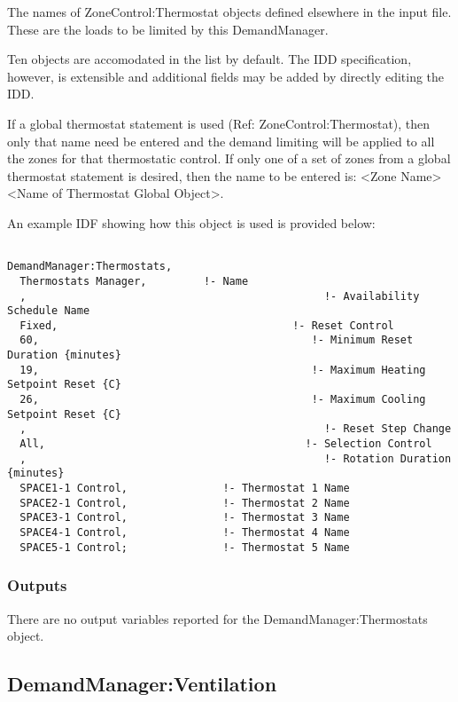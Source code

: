 The names of ZoneControl:Thermostat objects defined elsewhere in the input file. These are the loads to be limited by this DemandManager.

Ten objects are accomodated in the list by default. The IDD specification, however, is extensible and additional fields may be added by directly editing the IDD.

If a global thermostat statement is used (Ref: ZoneControl:Thermostat), then only that name need be entered and the demand limiting will be applied to all the zones for that thermostatic control. If only one of a set of zones from a global thermostat statement is desired, then the name to be entered is: \textless{}Zone Name\textgreater{} \textless{}Name of Thermostat Global Object\textgreater{}.

An example IDF showing how this object is used is provided below:

\begin{lstlisting}

DemandManager:Thermostats,
  Thermostats Manager,         !- Name
  ,                                               !- Availability Schedule Name
  Fixed,                                     !- Reset Control
  60,                                           !- Minimum Reset Duration {minutes}
  19,                                           !- Maximum Heating Setpoint Reset {C}
  26,                                           !- Maximum Cooling Setpoint Reset {C}
  ,                                               !- Reset Step Change
  All,                                         !- Selection Control
  ,                                               !- Rotation Duration {minutes}
  SPACE1-1 Control,               !- Thermostat 1 Name
  SPACE2-1 Control,               !- Thermostat 2 Name
  SPACE3-1 Control,               !- Thermostat 3 Name
  SPACE4-1 Control,               !- Thermostat 4 Name
  SPACE5-1 Control;               !- Thermostat 5 Name
\end{lstlisting}

\subsubsection{Outputs}\label{outputs-4-002}

There are no output variables reported for the DemandManager:Thermostats object.

\subsection{DemandManager:Ventilation}\label{demandmanagerventilation}

